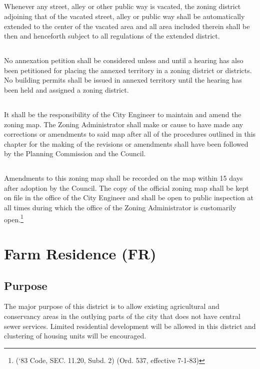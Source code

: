 \subsection{}
Whenever any street, alley or other public way is vacated, the zoning district adjoining that of the vacated street, alley or public way shall be automatically extended to the center of the vacated area and all area included therein shall be then and henceforth subject to all regulations of the extended district.
\subsection{}
No annexation petition shall be considered unless and until a hearing has also been petitioned for placing the annexed territory in a zoning district or districts.  No building permits shall be issued in annexed territory until the hearing has been held and assigned a zoning district.
\subsection{}
It shall be the responsibility of the City Engineer to maintain and amend the zoning map.  The Zoning Administrator shall make or cause to have made any corrections or amendments to said map after all of the procedures outlined in this chapter for the making of the revisions or amendments shall have been followed by the Planning Commission and the Council.
\subsection{}
Amendments to this zoning map shall be recorded on the map within 15 days after adoption by the Council.  The copy of the official zoning map shall be kept on file in the office of the City Engineer and shall be open to public inspection at all times during which the office of the Zoning Administrator is customarily open.\footnote{(‘83 Code, SEC. 11.20, Subd. 2)  (Ord. 537, effective 7-1-83)}


\setcounter{section}{34}
\section{Farm Residence (FR)}
\subsection{Purpose}
The major purpose of this district is to allow existing agricultural and conservancy areas in the outlying parts of the city that does not have central sewer services. Limited residential development will be allowed in this district and clustering of housing units will be encouraged.
